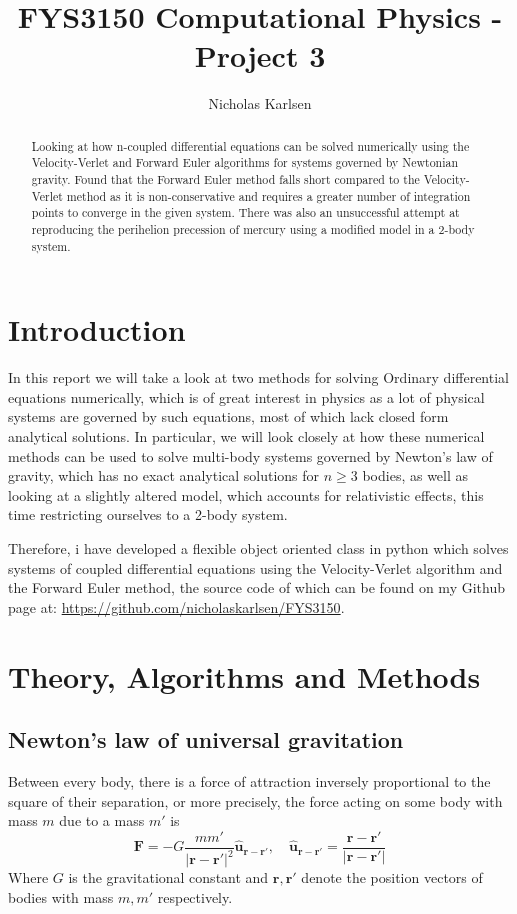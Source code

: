 \documentclass[10pt,showpacs,preprintnumbers,amsmath,amssymb,nofootinbib,aps,prl,twocolumn,groupedaddress,superscriptaddress,showkeys]{revtex4-1}
\begin{document}
\title{FYS3150 Computational Physics - Project 3}
\author{Nicholas Karlsen}


\begin{abstract}
  Looking at how n-coupled differential equations can be solved numerically using the Velocity-Verlet and Forward Euler algorithms for systems governed by Newtonian gravity. Found that the Forward Euler method falls short compared to the Velocity-Verlet method as it is non-conservative and requires a greater number of integration points to converge in the given system. There was also an unsuccessful attempt at reproducing the perihelion precession of mercury using a modified model in a 2-body system.
\end{abstract}

\maketitle


\section{Introduction}

  In this report we will take a look at two methods for solving Ordinary differential equations numerically, which is of great interest in physics as a lot of physical systems are governed by such equations, most of which lack closed form analytical solutions. In particular, we will look closely at how these numerical methods can be used to solve multi-body systems governed by Newton's law of gravity, which has no exact analytical solutions for $n\geq3$ bodies, as well as looking at a slightly altered model, which accounts for relativistic effects, this time restricting ourselves to a 2-body system.

  Therefore, i have developed a flexible object oriented class in python which solves systems of coupled differential equations using the Velocity-Verlet algorithm and the Forward Euler method, the source code of which can be found on my Github page at: \url{https://github.com/nicholaskarlsen/FYS3150}. 

\section{Theory, Algorithms and Methods}
  
  \subsection{Newton's law of universal gravitation}
    Between every body, there is a force of attraction inversely proportional to the square of their separation, or more precisely, the force acting on some body with mass $m$ due to a mass $m'$ is
    \begin{equation}
      \mathbf F = -G\frac{m m'}{|\mathbf r - \mathbf r'|^2}\mathbf{\hat{u}_{r-r'}}, \quad \mathbf{\hat{u}_{r-r'}} = \frac{\mathbf r - \mathbf r'}{\mathbf |\mathbf r - \mathbf r'|}
      \label{eqn:newton gravity}
    \end{equation}
    Where $G$ is the gravitational constant and $\mathbf r, \mathbf r'$ denote the position vectors of bodies with mass $m, m'$ respectively.
\end{document}
